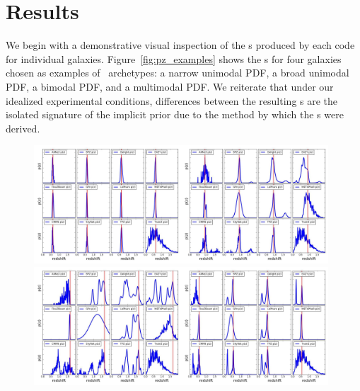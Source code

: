 \section{Results}
\label{sec:results}

We begin with a demonstrative visual inspection of the \pzpdf s produced by each code for individual galaxies.
Figure~\ref{fig:pz_examples} shows the \pzpdf s for four galaxies chosen as examples of \pzpdf\ archetypes: a narrow unimodal PDF, a broad unimodal PDF, a bimodal PDF, and a multimodal PDF.
We reiterate that under our idealized experimental conditions, differences between the resulting \pzpdf s are the isolated signature of the implicit prior due to the method by which the \pzpdf s were derived.

\begin{figure}
\includegraphics[width=0.49\textwidth]{fig/pz_12codes_261931_noseaborn_crop.jpg}\includegraphics[width=0.49\textwidth]{fig/pz_12codes_471167_noseaborn_crop.jpg}\\
\includegraphics[width=0.49\textwidth]{fig/pz_12codes_713178_noseaborn_crop.jpg}\includegraphics[width=0.49\textwidth]{fig/pz_12codes_982747_noseaborn_crop.jpg}

\end{figure}
